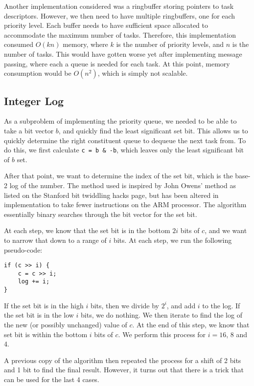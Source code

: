 \documentclass{article}
\begin{document}
Another implementation considered was a ringbuffer storing pointers to task descriptors.
However, we then need to have multiple ringbuffers, one for each priority level.
Each buffer needs to have sufficient space allocated to accommodate the maximum
number of tasks.
Therefore, this implementation consumed $O(kn)$ memory, where $k$ is the number
of priority levels, and $n$ is the number of tasks.
This would have gotten worse yet after implementing message passing, where each
a queue is needed for each task.
At this point, memory consumption would be $O(n^2)$, which is simply not scalable.

\subsection{Integer Log}
As a subproblem of implementing the priority queue, we needed to be able to take
a bit vector $b$, and quickly find the least significant set bit.
This allows us to quickly determine the right constituent queue to dequeue the next
task from.
To do this, we first calculate \texttt{c = b \& -b}, which leaves only the least significant
bit of $b$ set.

After that point, we want to determine the index of the set bit, which is the
base-2 log of the number.
The method used is inspired by John Owens' method as listed on the Stanford bit
twiddling hacks page, but has been altered in implementation to take fewer
instructions on the ARM processor.
The algorithm essentially binary searches through the bit vector for the set bit.

At each step, we know that the set bit is in the bottom $2i$ bits of $c$, and we want
to narrow that down to a range of $i$ bits.
At each step, we run the following pseudo-code:

\begin{center}
\begin{lstlisting}
if (c >> i) {
    c = c >> i;
    log += i;
}
\end{lstlisting}
\end{center}

If the set bit is in the high $i$ bits, then we divide by $2^i$, and add $i$ to the log.
If the set bit is in the low $i$ bits, we do nothing.
We then iterate to find the log of the new (or possibly unchanged) value of $c$.
At the end of this step, we know that set bit is within the bottom $i$ bits of $c$.
We perform this process for $i=16$, 8 and 4.

A previous copy of the algorithm then repeated the process for a shift of 2 bits and 1 bit
to find the final result.
However, it turns out that there is a trick that can be used for the last 4 cases.
\end{document}
